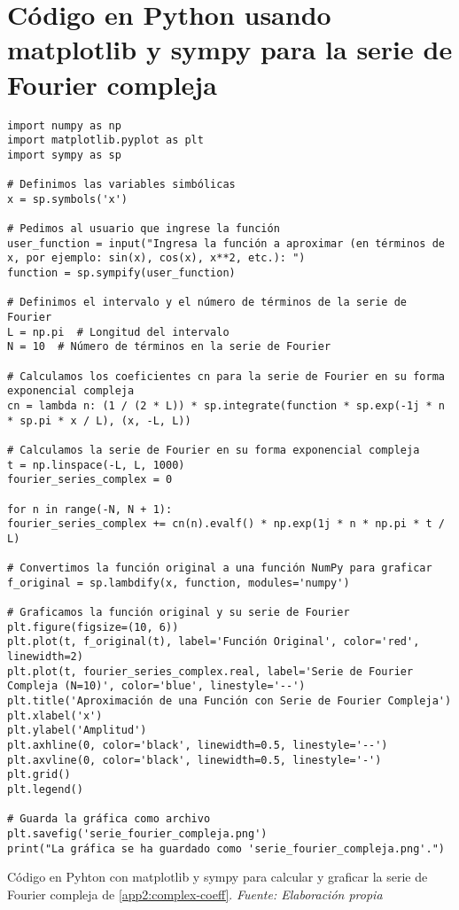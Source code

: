 \section{Código en Python usando matplotlib y sympy para la serie de Fourier compleja}\label{app3:complex-code-python-matplotlib-sympy}
\begin{longlisting}
	\begin{verbatim}
import numpy as np
import matplotlib.pyplot as plt
import sympy as sp

# Definimos las variables simbólicas
x = sp.symbols('x')

# Pedimos al usuario que ingrese la función
user_function = input("Ingresa la función a aproximar (en términos de x, por ejemplo: sin(x), cos(x), x**2, etc.): ")
function = sp.sympify(user_function)

# Definimos el intervalo y el número de términos de la serie de Fourier
L = np.pi  # Longitud del intervalo
N = 10  # Número de términos en la serie de Fourier

# Calculamos los coeficientes cn para la serie de Fourier en su forma exponencial compleja
cn = lambda n: (1 / (2 * L)) * sp.integrate(function * sp.exp(-1j * n * sp.pi * x / L), (x, -L, L))

# Calculamos la serie de Fourier en su forma exponencial compleja
t = np.linspace(-L, L, 1000)
fourier_series_complex = 0

for n in range(-N, N + 1):
fourier_series_complex += cn(n).evalf() * np.exp(1j * n * np.pi * t / L)

# Convertimos la función original a una función NumPy para graficar
f_original = sp.lambdify(x, function, modules='numpy')

# Graficamos la función original y su serie de Fourier
plt.figure(figsize=(10, 6))
plt.plot(t, f_original(t), label='Función Original', color='red', linewidth=2)
plt.plot(t, fourier_series_complex.real, label='Serie de Fourier Compleja (N=10)', color='blue', linestyle='--')
plt.title('Aproximación de una Función con Serie de Fourier Compleja')
plt.xlabel('x')
plt.ylabel('Amplitud')
plt.axhline(0, color='black', linewidth=0.5, linestyle='--')
plt.axvline(0, color='black', linewidth=0.5, linestyle='-')
plt.grid()
plt.legend()

# Guarda la gráfica como archivo
plt.savefig('serie_fourier_compleja.png')
print("La gráfica se ha guardado como 'serie_fourier_compleja.png'.")
	\end{verbatim}
	\caption[Código en Pyhton con matplotlib y sympy para calcular y graficar la serie de Fourier compleja de \ref{app2:complex-coeff}.] {Código en Pyhton con matplotlib y sympy para calcular y graficar la serie de Fourier compleja de \ref{app2:complex-coeff}. \textit{Fuente: Elaboración propia}} 
\end{longlisting}


